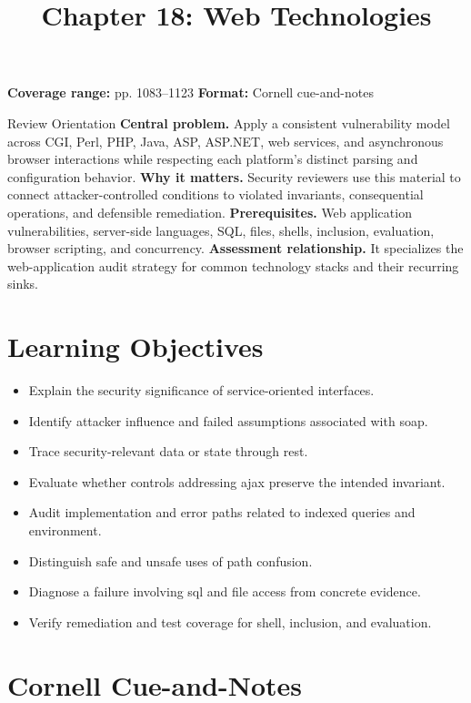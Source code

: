 \documentclass[11pt,letterpaper]{article}
\title{Chapter 18: Web Technologies}
\author{}
\date{}
\begin{document}
\maketitle

\begin{center}
\small\color{Meta}\textbf{Coverage range:} pp. 1083--1123 \quad\textbullet\quad \textbf{Format:} Cornell cue-and-notes
\end{center}
\vspace{0.25em}
\begin{CornellOverviewBox}{Review Orientation}
\textbf{Central problem.} Apply a consistent vulnerability model across CGI, Perl, PHP, Java, ASP, ASP.NET, web services, and asynchronous browser interactions while respecting each platform's distinct parsing and configuration behavior.
\textbf{Why it matters.} Security reviewers use this material to connect attacker-controlled conditions to violated invariants, consequential operations, and defensible remediation.
\textbf{Prerequisites.} Web application vulnerabilities, server-side languages, SQL, files, shells, inclusion, evaluation, browser scripting, and concurrency.
\textbf{Assessment relationship.} It specializes the web-application audit strategy for common technology stacks and their recurring sinks.
\end{CornellOverviewBox}
\section{Learning Objectives}
\begin{itemize}
\item Explain the security significance of service-oriented interfaces.
\item Identify attacker influence and failed assumptions associated with soap.
\item Trace security-relevant data or state through rest.
\item Evaluate whether controls addressing ajax preserve the intended invariant.
\item Audit implementation and error paths related to indexed queries and environment.
\item Distinguish safe and unsafe uses of path confusion.
\item Diagnose a failure involving sql and file access from concrete evidence.
\item Verify remediation and test coverage for shell, inclusion, and evaluation.
\end{itemize}
\section{Cornell Cue-and-Notes}
\end{document}
